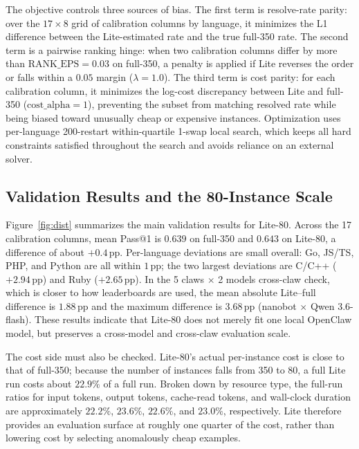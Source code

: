 The objective controls three sources of bias. The first term is resolve-rate parity: over the $17\times 8$ grid of calibration columns by language, it minimizes the L1 difference between the Lite-estimated rate and the true full-350 rate. The second term is a pairwise ranking hinge: when two calibration columns differ by more than $\textrm{RANK\_EPS}=0.03$ on full-350, a penalty is applied if Lite reverses the order or falls within a $0.05$ margin ($\lambda=1.0$). The third term is cost parity: for each calibration column, it minimizes the log-cost discrepancy between Lite and full-350 ($\textrm{cost\_alpha}=1$), preventing the subset from matching resolved rate while being biased toward unusually cheap or expensive instances. Optimization uses per-language 200-restart within-quartile 1-swap local search, which keeps all hard constraints satisfied throughout the search and avoids reliance on an external solver.

\subsection{Validation Results and the 80-Instance Scale}

Figure~\ref{fig:dist} summarizes the main validation results for Lite-80. Across the 17 calibration columns, mean Pass@1 is $0.639$ on full-350 and $0.643$ on Lite-80, a difference of about $+0.4$\,pp. Per-language deviations are small overall: Go, JS/TS, PHP, and Python are all within $1$\,pp; the two largest deviations are C/C++ ($+2.94$\,pp) and Ruby ($+2.65$\,pp). In the 5 claws $\times$ 2 models cross-claw check, which is closer to how leaderboards are used, the mean absolute Lite--full difference is $1.88$\,pp and the maximum difference is $3.68$\,pp (nanobot $\times$ Qwen 3.6-flash). These results indicate that Lite-80 does not merely fit one local OpenClaw model, but preserves a cross-model and cross-claw evaluation scale.

The cost side must also be checked. Lite-80's actual per-instance cost is close to that of full-350; because the number of instances falls from 350 to 80, a full Lite run costs about $22.9\%$ of a full run. Broken down by resource type, the full-run ratios for input tokens, output tokens, cache-read tokens, and wall-clock duration are approximately $22.2\%$, $23.6\%$, $22.6\%$, and $23.0\%$, respectively. Lite therefore provides an evaluation surface at roughly one quarter of the cost, rather than lowering cost by selecting anomalously cheap examples.

